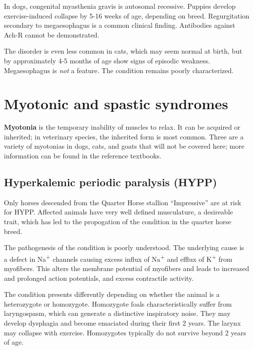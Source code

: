 \documentclass[openany]{report}
\begin{document}
In dogs, congenital myasthenia gravis is autosomal recessive. Puppies
develop exercise-induced collapse by 5-16 weeks of age, depending on
breed. Regurgitation secondary to megaesophagus is a common clinical
finding. Antibodies against Ach-R cannot be demonstrated.

The disorder is even less common in cats, which may seem normal at
birth, but by approximately 4-5 months of age show signs of episodic
weakness. Megaesophagus is \emph{not} a feature. The condition remains
poorly characterized.

\section{Myotonic and spastic
syndromes}\label{myotonic-and-spastic-syndromes}

\textbf{Myotonia} is the temporary inability of muscles to relax. It can
be acquired or inherited; in veterinary species, the inherited form is
most common. Three are a variety of myotonias in dogs, cats, and goats
that will not be covered here; more information can be found in the
reference textbooks.

\hypertarget{hyperkalemic-periodic-paralysis-hypp}{\subsection{Hyperkalemic
periodic paralysis (HYPP)}\label{hyperkalemic-periodic-paralysis-hypp}}

Only horses descended from the Quarter Horse stallion ``Impressive'' are
at risk for HYPP. Affected animals have very well defined musculature, a
desireable trait, which has led to the propogation of the condition in
the quarter horse breed.

The pathogenesis of the condition is poorly understood. The underlying
cause is a defect in Na\textsuperscript{+} channels causing excess
influx of Na\textsuperscript{+} and efflux of K\textsuperscript{+} from
myofibers. This alters the membrane potential of myofibers and leads to
increased and prolonged action potentials, and excess contractile
activity.

The condition presents differently depending on whether the animal is a
heterozygote or homozygote. Homozygote foals characteristically suffer
from laryngospasm, which can generate a distinctive inspiratory noise.
They may develop dysphagia and become emaciated during their first 2
years. The larynx may collapse with exercise. Homozygotes typically do
not survive beyond 2 years of age.
\end{document}

